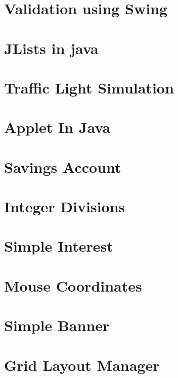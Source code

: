 \documentclass{article}
\begin{document}
\section{Validation using Swing}

\newpage

\section{JLists in java}

\newpage

\section{Traffic Light Simulation}

\newpage

\section{Applet In Java}

\newpage

\section{Savings Account}

\newpage

\section{Integer Divisions}

\newpage

\section{Simple Interest}

\newpage

\section{Mouse Coordinates}

\newpage

\section{Simple Banner}

\newpage

\section{Grid Layout Manager}

\newpage
\end{document}
